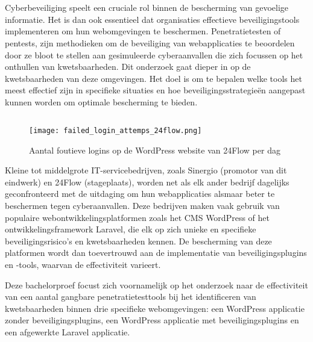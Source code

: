 
\chapter{}%
\label{ch:inleiding}
Cyberbeveiliging speelt een cruciale rol binnen de bescherming van gevoelige informatie. Het is dan ook essentieel dat organisaties 
effectieve beveiligingstools implementeren om hun webomgevingen te beschermen. Penetratietesten of pentests, zijn  
methodieken om de beveiliging van webapplicaties te beoordelen door ze bloot te stellen aan gesimuleerde 
cyberaanvallen die zich focussen op het onthullen van kwetsbaarheden. Dit onderzoek gaat dieper in op de kwetsbaarheden van deze omgevingen. Het doel is om te bepalen welke tools 
het meest effectief zijn in specifieke situaties en hoe beveiligingsstrategieën aangepast kunnen worden om optimale 
bescherming te bieden.


\section{}%
\label{sec:probleemstelling}

\begin{figure}
  \centering
  \texttt{[image: failed\_login\_attemps\_24flow.png]}
  \caption[Aantal foutieve logins op de WordPress website van 24Flow per dag ]{Aantal foutieve logins op de WordPress website van 24Flow per dag }
\end{figure}
Kleine tot middelgrote IT-servicebedrijven, zoals Sinergio (promotor van dit eindwerk) en 24Flow (stageplaats), worden net 
als elk ander bedrijf dagelijks geconfronteerd met de uitdaging om hun 
webapplicaties alsmaar beter te beschermen tegen cyberaanvallen. Deze bedrijven maken vaak gebruik van populaire webontwikkelingsplatformen 
zoals het CMS WordPress of het ontwikkelingsframework Laravel, die elk op zich unieke en specifieke beveiligingsrisico's en 
kwetsbaarheden kennen. De bescherming van deze platformen wordt dan toevertrouwd aan de implementatie van beveiligingsplugins 
en -tools, waarvan de effectiviteit varieert.

Deze bachelorproef focust zich voornamelijk op het onderzoek naar de effectiviteit van een aantal gangbare penetratietesttools  
bij het identificeren van kwetsbaarheden binnen drie specifieke webomgevingen: een WordPress applicatie zonder beveiligingsplugins,
een WordPress applicatie met beveiligingsplugins en een afgewerkte Laravel applicatie. 

